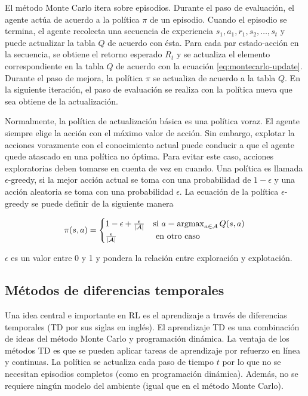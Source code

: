 El método Monte Carlo itera sobre episodios. Durante el paso de evaluación, el 
agente actúa de acuerdo a la política $\pi$ de un episodio. Cuando el 
episodio se termina, el agente recolecta una secuencia de experiencia $s_1, a_1, r_1, s_2, \dots, s_t$ y puede actualizar la tabla $Q$ de acuerdo
con ésta.
Para cada par estado-acción en la secuencia, se obtiene el retorno 
esperado $R_t$ y se actualiza el elemento correspondiente en la tabla $Q$ 
de acuerdo con la ecuación \ref{eq:montecarlo-update}.
Durante el paso de mejora,  la
política $\pi$ se actualiza de acuerdo a la tabla $Q$. En la siguiente iteración,
el paso de evaluación se realiza con la política nueva que sea obtiene de la
actualización.

Normalmente, la política de actualización básica es una política voraz. El agente
siempre elige la acción con el máximo valor de acción. Sin embargo, explotar la acciones vorazmente con el conocimiento actual puede conducir a que el
agente quede atascado en una política no óptima. Para evitar 
este caso, acciones exploratorias deben tomarse en cuenta de vez en cuando.
Una política es llamada $\epsilon$-greedy, si la mejor acción actual se toma 
con una probabilidad de $1-\epsilon$ y una acción aleatoria se toma con una 
probabilidad $\epsilon$. La ecuación de la política $\epsilon$-greedy
se puede definir de la siguiente manera

\begin{equation}\label{eq:epsilongreedy}
\pi(s,a) = 
   \begin{cases} 
      1 - \epsilon + \frac{\epsilon}{|\mathcal{A}|} & \mbox{si } a= 
      \operatorname*{argmax}_{a \in \mathcal{A}} 
      Q(s,a)   \\
      \frac{\epsilon}{|\mathcal{A}|} & \mbox{ en otro caso }
   \end{cases}
\end{equation}

$\epsilon$ es un valor entre 0 y 1 y pondera la relación entre
exploración y explotación.

\subsection{Métodos de diferencias temporales}

Una idea central e importante en RL es el aprendizaje 
a través de diferencias temporales (TD por sus siglas en inglés).
El aprendizaje TD es una combinación de ideas del método Monte Carlo y programación dinámica. 
La ventaja de los métodos TD es que se pueden aplicar tareas de aprendizaje por refuerzo en línea y continuas.
La política se actualiza cada paso de tiempo $t$ por lo que no se necesitan
episodios completos (como en programación dinámica). Además, no se requiere ningún modelo del ambiente (igual que en el método Monte Carlo). 


